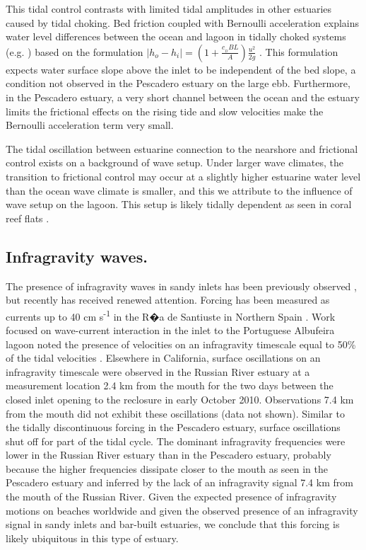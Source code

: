 This tidal control contrasts with limited tidal amplitudes in other
estuaries caused by tidal choking. Bed friction coupled with Bernoulli
acceleration explains water level differences between the ocean and
lagoon in tidally choked systems (e.g. \cite{rydberg_tidal_1996,hill_fortnightly_1994})
 based on the formulation \emph{$\left|h_{o}-h_{i}\right|=\left(1+\frac{c_{_D}BL}{A}\right)\frac{u^{2}}{2g}$}
\parencite{stigebrandt_aspects_1980}. This formulation expects water
surface slope above the inlet to be independent of the bed slope,
a condition not observed in the Pescadero estuary on the large ebb.
Furthermore, in the Pescadero estuary, a very short channel between
the ocean and the estuary limits the frictional effects on the rising
tide and slow velocities make the Bernoulli acceleration term very
small. 

The tidal oscillation between estuarine connection to the nearshore
and frictional control exists on a background of wave setup. Under
larger wave climates, the transition to frictional control may occur
at a slightly higher estuarine water level than the ocean wave climate
is smaller, and this we attribute to the influence of wave setup on
the lagoon. This setup is likely tidally dependent as seen in coral
reef flats \parencite{becker_water_2014}.


\subsection{Infragravity waves. }

The presence of infragravity waves in sandy inlets has been previously
observed\emph{ \parencite{schubert_infragravity_1991}}, but recently has
received renewed attention. Forcing has been measured as currents
up to 40 cm s\textsuperscript{-1} in the R�a de Santiuste in Northern
Spain \parencite{uncles_infragravity_2014}. Work focused on wave-current interaction
in the inlet to the Portuguese Albufeira lagoon noted the presence
of velocities on an infragravity timescale equal to 50\% of the tidal
velocities \parencite{dodet_wave-current_2013}. Elsewhere in California, surface
oscillations on an infragravity timescale were observed in the Russian
River estuary at a measurement location 2.4 km from the mouth for
the two days between the closed inlet opening to the reclosure in
early October 2010. Observations 7.4 km from the mouth did not exhibit
these oscillations (data not shown). Similar to the tidally discontinuous
forcing in the Pescadero estuary, surface oscillations shut off for
part of the tidal cycle. The dominant infragravity frequencies were
lower in the Russian River estuary than in the Pescadero estuary,
probably because the higher frequencies dissipate closer to the mouth
as seen in the Pescadero estuary and inferred by the lack of an infragravity
signal 7.4 km from the mouth of the Russian River. Given the expected
presence of infragravity motions on beaches worldwide \parencite{contardo_infragravity_2013}
and given the observed presence of an infragravity signal in sandy
inlets and bar-built estuaries, we conclude that this forcing is likely
ubiquitous in this type of estuary.

